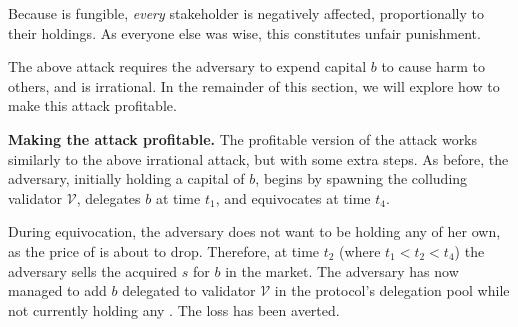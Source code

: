 
Because \stasset is fungible, \emph{every} stakeholder is negatively affected,
proportionally to their holdings.
As everyone else was
wise, this constitutes unfair punishment.

The above attack requires the adversary to expend capital $b$ to cause
harm to others, and is irrational. In the remainder of this section, we
will explore how to make this attack profitable.


\noindent
\textbf{Making the attack profitable.}
The profitable version of the attack works similarly to the above
irrational attack, but with some extra steps. As before, the adversary, initially
holding a capital of $b$, begins by spawning the colluding validator $\mathcal{V}$,
delegates $b$ at time $t_1$, and equivocates at time $t_4$.

During equivocation, the adversary does not want to be holding any
\stasset of her own, as the price of \stasset is about to drop.
Therefore, at time $t_2$ (where $t_1 < t_2 < t_4$) the adversary sells
the acquired $s$ \stasset for $b$ \asset in the market.
The adversary has now managed to add $b$ \asset delegated to validator $\mathcal{V}$
in the protocol's delegation pool while not currently holding
any \stasset. The loss has been averted.

